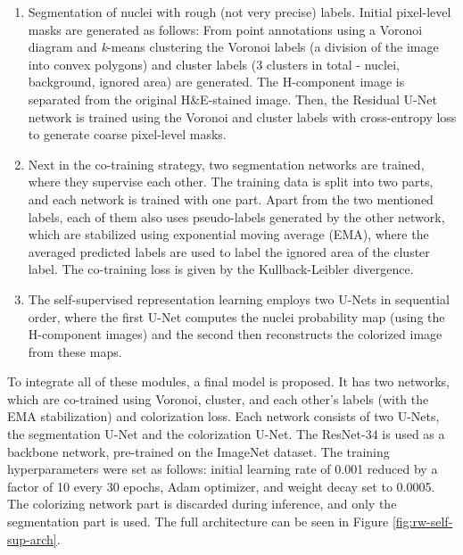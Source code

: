 \begin{enumerate}
    \item Segmentation of nuclei with rough (not very precise) labels. Initial pixel-level masks are generated as follows: From point annotations using a Voronoi diagram and \textit{k}-means clustering the Voronoi labels (a division of the image into convex polygons) and cluster labels (3 clusters in total - nuclei, background, ignored area) are generated. The H-component image is separated from the original H\&E-stained image. Then, the Residual U-Net network is trained using the Voronoi and cluster labels with cross-entropy loss to generate coarse pixel-level masks.
    \item Next in the co-training strategy, two segmentation networks are trained, where they supervise each other. The training data is split into two parts, and each network is trained with one part. Apart from the two mentioned labels, each of them also uses pseudo-labels generated by the other network, which are stabilized using exponential moving average (EMA), where the averaged predicted labels are used to label the ignored area of the cluster label. The co-training loss is given by the Kullback-Leibler divergence.
    \item The self-supervised representation learning employs two U-Nets in sequential order, where the first U-Net computes the nuclei probability map (using the H-component images) and the second then reconstructs the colorized image from these maps.
\end{enumerate}

To integrate all of these modules, a final model is proposed. It has two networks, which are co-trained using Voronoi, cluster, and each other's labels (with the EMA stabilization) and colorization loss. Each network consists of two U-Nets, the segmentation U-Net and the colorization U-Net. The ResNet-34 is used as a backbone network, pre-trained on the ImageNet dataset. The training hyperparameters were set as follows: initial learning rate of 0.001 reduced by a factor of 10 every 30 epochs, Adam optimizer, and weight decay set to 0.0005. The colorizing network part is discarded during inference, and only the segmentation part is used. The full architecture can be seen in Figure \ref{fig:rw-self-sup-arch}.

